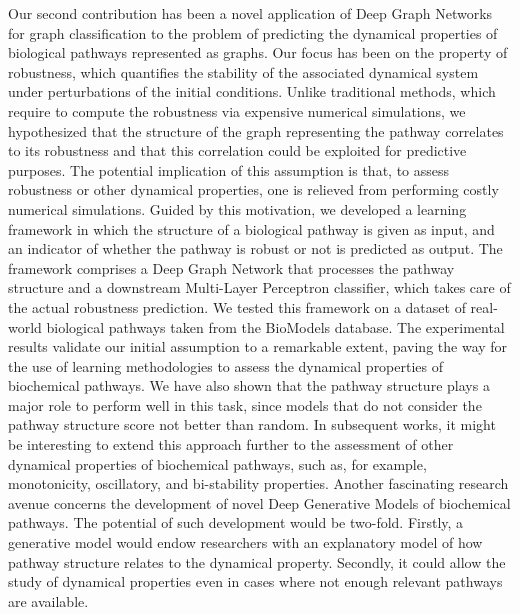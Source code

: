 Our second contribution has been a novel application of Deep Graph Networks for graph classification to the problem of predicting the dynamical properties of biological pathways represented as graphs. Our focus has been on the property of robustness, which quantifies the stability of the associated dynamical system under perturbations of the initial conditions. Unlike traditional methods, which require to compute the robustness via expensive numerical simulations, we hypothesized that the structure of the graph representing the pathway correlates to its robustness and that this correlation could be exploited for predictive purposes. The potential implication of this assumption is that, to assess robustness or other dynamical properties, one is relieved from performing costly numerical simulations. Guided by this motivation, we developed a learning framework in which the structure of a biological pathway is given as input, and an indicator of whether the pathway is robust or not is predicted as output. The framework comprises a Deep Graph Network that processes the pathway structure and a downstream Multi-Layer Perceptron classifier, which takes care of the actual robustness prediction. We tested this framework on a dataset of real-world biological pathways taken from the BioModels database. The experimental results validate our initial assumption to a remarkable extent, paving the way for the use of learning methodologies to assess the dynamical properties of biochemical pathways. We have also shown that the pathway structure plays a major role to perform well in this task, since models that do not consider the pathway structure score not better than random. In subsequent works, it might be interesting to extend this approach further to the assessment of other dynamical properties of biochemical pathways, such as, for example, monotonicity, oscillatory, and bi-stability properties. Another fascinating research avenue concerns the development of novel Deep Generative Models of biochemical pathways. The potential of such development would be two-fold. Firstly, a generative model would endow researchers with an explanatory model of how pathway structure relates to the dynamical property. Secondly, it could allow the study of dynamical properties even in cases where not enough relevant pathways are available.
\vspace{1em}

